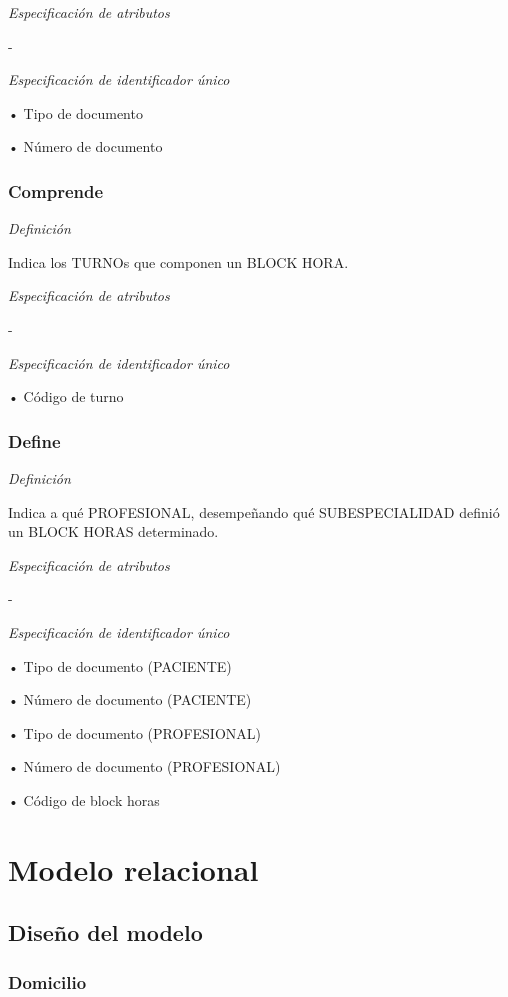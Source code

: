 \documentclass[a4paper,11pt]{article}
\begin{document}
\textit{Especificación de atributos}

-

\textit{Especificación de identificador único}

• Tipo de documento

• Número de documento\label{HToc293405828}

\subsubsection{\textbf{Comprende}}

\textit{Definición}

Indica los TURNOs que componen un BLOCK HORA.

\textit{Especificación de atributos}

-

\textit{Especificación de identificador único}

• Código de turno\label{HToc293405829}

\subsubsection{\textbf{Define}}

\textit{Definición}

Indica a qué PROFESIONAL, desempeñando qué SUBESPECIALIDAD definió un BLOCK 
HORAS determinado.

\textit{Especificación de atributos}

-

\textit{Especificación de identificador único}

• Tipo de documento (PACIENTE)

• Número de documento (PACIENTE)

• Tipo de documento (PROFESIONAL)

• Número de documento (PROFESIONAL)

• Código de block horas\pagebreak{}\label{HToc293405830}

\section{\textbf{Modelo relacional\label{HToc293405831}}}

\subsection{\textbf{Diseño del modelo\label{HToc293405832}}}

\subsubsection{\textbf{Domicilio}}
\end{document}
